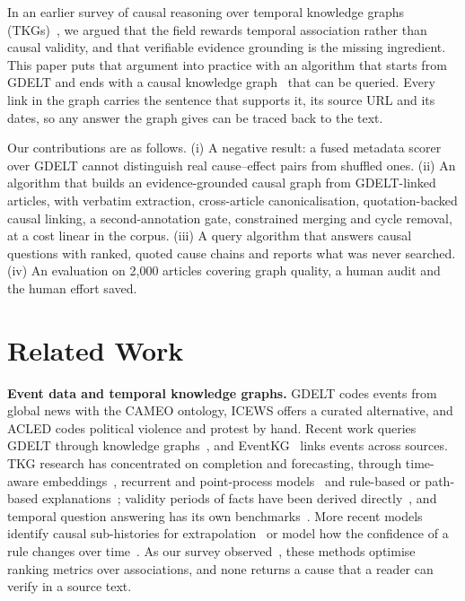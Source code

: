 \documentclass[conference]{IEEEtran}
\begin{document}
In an earlier survey of causal reasoning over temporal knowledge graphs (TKGs)~\cite{survey}, we
argued that the field rewards temporal association rather than causal validity, and that verifiable
evidence grounding is the missing ingredient. This paper puts that argument into practice with an
algorithm that starts from GDELT and ends with a causal knowledge graph~\cite{hogan} that can be
queried. Every link in the graph carries the sentence that supports it, its source URL and its
dates, so any answer the graph gives can be traced back to the text.

Our contributions are as follows. (i) A negative result: a fused metadata scorer over GDELT cannot
distinguish real cause--effect pairs from shuffled ones. (ii) An algorithm that builds an
evidence-grounded causal graph from GDELT-linked articles, with verbatim extraction, cross-article
canonicalisation, quotation-backed causal linking, a second-annotation gate, constrained merging
and cycle removal, at a cost linear in the corpus. (iii) A query algorithm that answers causal
questions with ranked, quoted cause chains and reports what was never searched. (iv) An evaluation
on 2{,}000 articles covering graph quality, a human audit and the human effort saved.

\section{Related Work}
\textbf{Event data and temporal knowledge graphs.} GDELT codes events from global news with the
CAMEO ontology, ICEWS offers a curated alternative, and ACLED codes political violence and protest
by hand. Recent work queries GDELT through knowledge graphs~\cite{myers}, and EventKG~\cite{eventkg}
links events across sources. TKG research has concentrated on completion and forecasting, through
time-aware embeddings~\cite{jiang16,garcia18,lacroix20}, recurrent and point-process
models~\cite{knowevolve,dyrep,renet,tgn} and rule-based or path-based explanations~\cite{tlogic,xerte};
validity periods of facts have been derived directly~\cite{leblay}, and temporal question answering
has its own benchmarks~\cite{cronkgqa,jia21,multitq}. More recent models identify causal
sub-histories for extrapolation~\cite{csi} or model how the confidence of a rule changes over
time~\cite{huang24}. As our survey observed~\cite{survey}, these methods optimise ranking metrics
over associations, and none returns a cause that a reader can verify in a source text.
\end{document}
